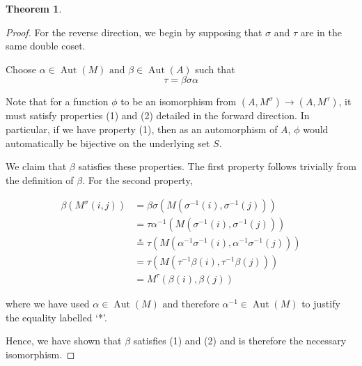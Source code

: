 \documentclass{article}
\theoremstyle{definition}
\newtheorem{theorem}{Theorem}
\begin{document}
\begin{theorem}
\begin{proof}
    \vspace{2em}
    For the reverse direction, we begin by supposing that \(\sigma\) and \(\tau\) are in the same double coset.

    Choose \(\alpha\in\operatorname{Aut}(M)\text{ and } \beta\in\operatorname{Aut}(A)\) such that 
    \[\tau=\beta\sigma\alpha\]

    Note that for a function \(\phi\) to be an isomorphism from \((A,M^\sigma)\to(A, M^\tau)\), it must satisfy properties (1) and (2) detailed in the forward direction. In particular, if we have property (1), then as an automorphism of \(A\), \(\phi\) would automatically be bijective on the underlying set \(S\).

    We claim that \(\beta\) satisfies these properties. The first property follows trivially from the definition of \(\beta\). For the second property, 

    \begin{align*}
        \beta(M^\sigma(i,j))&=\beta\sigma(M(\sigma^{-1}(i),\sigma^{-1}(j)))\\
        &=\tau\alpha^{-1}(M(\sigma^{-1}(i),\sigma^{-1}(j)))\\
        &\overset{*}{=}\tau(M(\alpha^{-1}\sigma^{-1}(i),\alpha^{-1}\sigma^{-1}(j)))\\
        &=\tau(M(\tau^{-1}\beta(i),\tau^{-1}\beta(j)))\\
        &=M^\tau(\beta(i),\beta(j))
    \end{align*}

    where we have used \(\alpha\in\operatorname{Aut}(M)\text{ and therefore }\alpha^{-1}\in\operatorname{Aut}(M)\) to justify the equality labelled `*'.

    Hence, we have shown that \(\beta\) satisfies (1) and (2) and is therefore the necessary isomorphism.
\end{proof}
\end{theorem}
\end{document}
